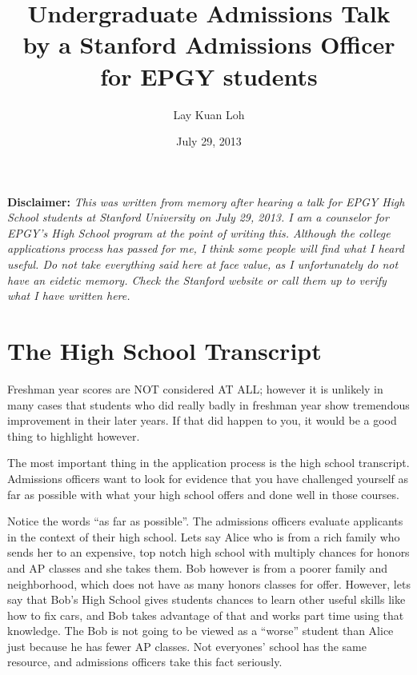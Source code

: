 \documentclass[12pt]{article}
\begin{document}

\title{Undergraduate Admissions Talk \\
	by a Stanford Admissions Officer for EPGY students}
\author{Lay Kuan Loh}
\date{July 29, 2013}
\maketitle


\textbf{Disclaimer:}
\textit{This was written from memory after hearing a talk for EPGY
High School students at Stanford University on July 29, 2013. 
I am a counselor for EPGY's High School program at the point of writing this.
Although the college applications process has passed for me,
I think some people will find what I heard useful.
Do not take everything said here at face value, as I unfortunately
do not have an eidetic memory. Check the Stanford website
or call them up to verify what I have written here.} 



\section{The High School Transcript}

Freshman year scores are NOT considered AT ALL; however it is unlikely
in many cases that students who did really badly in freshman year show
tremendous improvement in their later years. 
If that did happen to you, it would be a good thing to highlight however. 

The most important thing in the application process is the high
school transcript. Admissions officers want to look for evidence
that you have challenged yourself as far as possible with what your
high school offers and done well in those courses. 

Notice the words ``as far as possible''. The admissions officers
evaluate applicants in the context of their high school. Lets say Alice who is from
a rich family who sends her to an expensive, top notch high school 
with multiply chances for honors and AP classes and she takes them.
Bob however is from a poorer family and neighborhood, which does not
have as many honors classes for offer. However, lets say that Bob's
High School gives students chances to learn other useful skills
like how to fix cars, and Bob takes advantage of that and works part time
using that knowledge. The Bob is not going to be viewed as a ``worse''
student than Alice just because he has fewer AP classes.
Not everyones' school has the same resource, and admissions officers
take this fact seriously.
\end{document}
